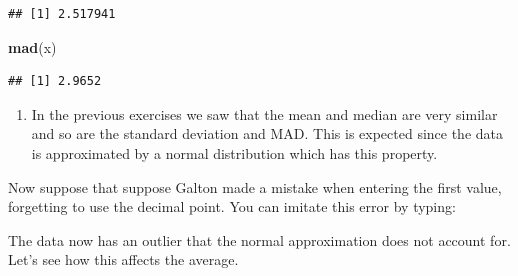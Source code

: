\documentclass[
]{article}
\newenvironment{Shaded}{\begin{snugshade}}{\end{snugshade}}
\newcommand{\DecValTok}[1]{\textcolor[rgb]{0.00,0.00,0.81}{#1}}
\newcommand{\KeywordTok}[1]{\textcolor[rgb]{0.13,0.29,0.53}{\textbf{#1}}}
\newcommand{\NormalTok}[1]{#1}
\newcommand{\OperatorTok}[1]{\textcolor[rgb]{0.81,0.36,0.00}{\textbf{#1}}}
\newcommand{\StringTok}[1]{\textcolor[rgb]{0.31,0.60,0.02}{#1}}
\providecommand{\tightlist}{%
  \setlength{\itemsep}{0pt}\setlength{\parskip}{0pt}}
\begin{document}
\begin{verbatim}
## [1] 2.517941
\end{verbatim}

\begin{Shaded}
\begin{Highlighting}[]
\KeywordTok{mad}\NormalTok{(x)}
\end{Highlighting}
\end{Shaded}

\begin{verbatim}
## [1] 2.9652
\end{verbatim}

\begin{enumerate}
\def\labelenumi{\arabic{enumi}.}
\setcounter{enumi}{2}
\tightlist
\item
  In the previous exercises we saw that the mean and median are very
  similar and so are the standard deviation and MAD. This is expected
  since the data is approximated by a normal distribution which has this
  property.
\end{enumerate}

Now suppose that suppose Galton made a mistake when entering the first
value, forgetting to use the decimal point. You can imitate this error
by typing:

\begin{Shaded}
\end{Shaded}

The data now has an outlier that the normal approximation does not
account for. Let's see how this affects the average.

\begin{Shaded}
\end{Shaded}
\end{document}
